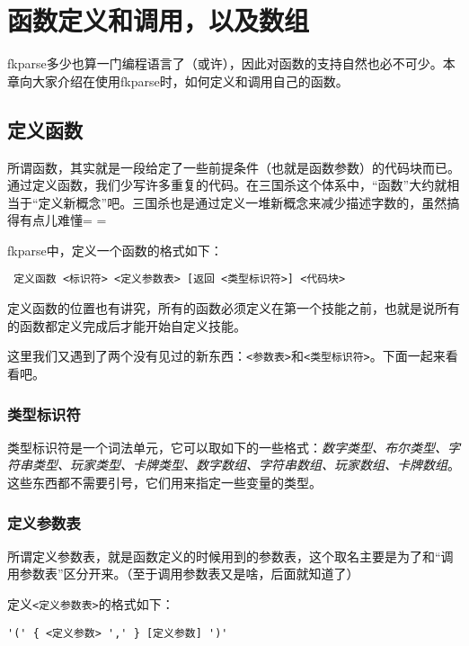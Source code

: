 \chapter{函数定义和调用，以及数组}

fkparse多少也算一门编程语言了（或许），因此对函数的支持自然也必不可少。本章向大家介绍在使用fkparse时，如何定义和调用自己的函数。

\section{定义函数}

所谓函数，其实就是一段给定了一些前提条件（也就是函数参数）的代码块而已。通过定义函数，我们少写许多重复的代码。在三国杀这个体系中，“函数”大约就相当于“定义新概念”吧。三国杀也是通过定义一堆新概念来减少描述字数的，虽然搞得有点儿难懂= =

fkparse中，定义一个函数的格式如下：

\begin{verbatim}
 定义函数 <标识符> <定义参数表> [返回 <类型标识符>] <代码块>
\end{verbatim}

定义函数的位置也有讲究，所有的函数必须定义在第一个技能之前，也就是说所有的函数都定义完成后才能开始自定义技能。

这里我们又遇到了两个没有见过的新东西：\verb|<参数表>|和\verb|<类型标识符>|。下面一起来看看吧。

\subsection{类型标识符}

类型标识符是一个词法单元，它可以取如下的一些格式：\emph{数字类型、布尔类型、字符串类型、玩家类型、卡牌类型、数字数组、字符串数组、玩家数组、卡牌数组}。这些东西都不需要引号，它们用来指定一些变量的类型。

\subsection{定义参数表}

所谓定义参数表，就是函数定义的时候用到的参数表，这个取名主要是为了和“调用参数表”区分开来。（至于调用参数表又是啥，后面就知道了）

定义\verb|<定义参数表>|的格式如下：

\begin{verbatim}
'(' { <定义参数> ',' } [定义参数] ')'
\end{verbatim}

